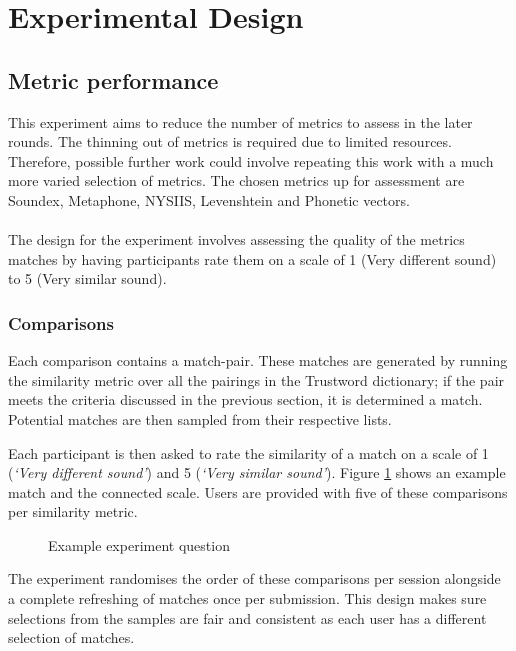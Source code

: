 \section{Experimental Design}

\subsection{Metric performance}
This experiment aims to reduce the number of metrics to assess in the later rounds. The thinning out of metrics is required due to limited resources. Therefore, possible further work could involve repeating this work with a much more varied selection of metrics. The chosen metrics up for assessment are Soundex, Metaphone, NYSIIS, Levenshtein and Phonetic vectors.
\\\\
The design for the experiment involves assessing the quality of the metrics matches by having participants rate them on a scale of 1 (Very different sound) to 5 (Very similar sound).

\subsubsection*{Comparisons}
Each comparison contains a match-pair. These matches are generated by running the similarity metric over all the pairings in the Trustword dictionary; if the pair meets the criteria discussed in the previous section, it is determined a match. Potential matches are then sampled from their respective lists.

Each participant is then asked to rate the similarity of a match on a scale of 1 (\textit{`Very different sound'}) and 5 (\textit{`Very similar sound'}). Figure \ref{fig:phoneticMatch} shows an example match and the connected scale. Users are provided with five of these comparisons per similarity metric.

\begin{figure}[h!]
    \centering
    \begin{adjustbox}{width=0.5\textwidth,center}
    \end{adjustbox}
    \caption{Example experiment question}
    \label{fig:phoneticMatch}
\end{figure}

The experiment randomises the order of these comparisons per session alongside a complete refreshing of matches once per submission. This design makes sure selections from the samples are fair and consistent as each user has a different selection of matches.

